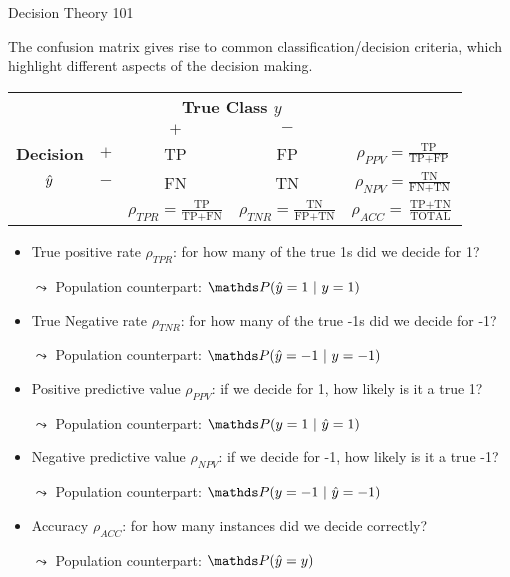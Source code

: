 \documentclass[11pt,compress,t,notes=noshow, xcolor=table]{beamer}
\begin{document}
\begin{vbframe}{Decision Theory 101}
%	
\scriptsize{
%	
	The confusion matrix gives rise to common classification/decision criteria, which highlight different aspects
	of the decision making.
%	
	\begin{center}
		\footnotesize
		\renewcommand{\arraystretch}{1.1}
		\begin{tabular}{cc||cc|c}
			& & \multicolumn{2}{c|}{\bfseries True Class $y$} & \\
			& & $+$ & $-$ & \\ 
			\hline \hline
			\bfseries Decision     & $+$ & TP & FP & $\rho_{PPV} = \frac{\text{TP}}{\text{TP} + \text{FP}}$\\
			$\hat{y}$ & $-$ & FN & TN & $\rho_{NPV} = \frac{\text{TN}}{\text{FN} + \text{TN}}$\\
			\hline
			& & $\rho_{TPR} = \frac{\text{TP}}{\text{TP} + \text{FN}}$ & $\rho_{TNR} = \frac{\text{TN}}{\text{FP} + \text{TN}}$ & $\rho_{ACC} = \frac{\text{TP}+ \text{TN}}{\text{TOTAL}}$
		\end{tabular}
		\renewcommand{\arraystretch}{1}
	\end{center}
%	
	\begin{itemize}
%		
		\item True positive rate $\rho_{TPR}$: for how many of the true 1s did we decide for 1?
%		
		\item [$\leadsto$] Population counterpart: $\P (\yh =1 ~|~ y=1)$
%		
		\item True Negative rate $\rho_{TNR}$: for how many of the true -1s did we decide for -1?
%		
		\item [$\leadsto$] Population counterpart: $\P (\yh = -1 ~|~ y= -1)$
%		
		\item Positive predictive value $\rho_{PPV}$: if we decide for 1, how likely is 
		it a true 1?
%		
		\item [$\leadsto$] Population counterpart: $\P (y = 1 ~|~ \yh = 1)$
%		
		\item Negative predictive value $\rho_{NPV}$: if we decide for -1, how likely is 
		it a true -1?
%		
		\item [$\leadsto$] Population counterpart: $\P (y = -1 ~|~ \yh = -1)$
%
		\item Accuracy $\rho_{ACC}$: for how many instances did we decide correctly?
%		
		\item [$\leadsto$] Population counterpart: $\P (\yh = y  )$
	\end{itemize}
}
\end{vbframe}
\end{document}
